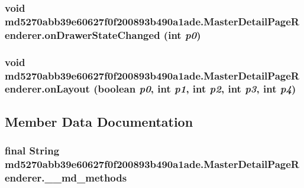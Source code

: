 \hypertarget{classmd5270abb39e60627f0f200893b490a1ade_1_1_master_detail_page_renderer_7b71dfbad27df2ecd675d05527840364}{
\subsubsection[{onDrawerStateChanged}]{\setlength{\rightskip}{0pt plus 5cm}void md5270abb39e60627f0f200893b490a1ade.MasterDetailPageRenderer.onDrawerStateChanged (int {\em p0})}}
\label{classmd5270abb39e60627f0f200893b490a1ade_1_1_master_detail_page_renderer_7b71dfbad27df2ecd675d05527840364}


\hypertarget{classmd5270abb39e60627f0f200893b490a1ade_1_1_master_detail_page_renderer_ea5f0c192c83f2cfc6c7ede79f81495f}{
\subsubsection[{onLayout}]{\setlength{\rightskip}{0pt plus 5cm}void md5270abb39e60627f0f200893b490a1ade.MasterDetailPageRenderer.onLayout (boolean {\em p0}, \/  int {\em p1}, \/  int {\em p2}, \/  int {\em p3}, \/  int {\em p4})}}
\label{classmd5270abb39e60627f0f200893b490a1ade_1_1_master_detail_page_renderer_ea5f0c192c83f2cfc6c7ede79f81495f}




\subsection{Member Data Documentation}
\hypertarget{classmd5270abb39e60627f0f200893b490a1ade_1_1_master_detail_page_renderer_6531570f30e058588a00d29aa7c87230}{
\subsubsection[{\_\-\_\-md\_\-methods}]{\setlength{\rightskip}{0pt plus 5cm}final String {\bf md5270abb39e60627f0f200893b490a1ade.MasterDetailPageRenderer.\_\-\_\-md\_\-methods}}}
\label{classmd5270abb39e60627f0f200893b490a1ade_1_1_master_detail_page_renderer_6531570f30e058588a00d29aa7c87230}


